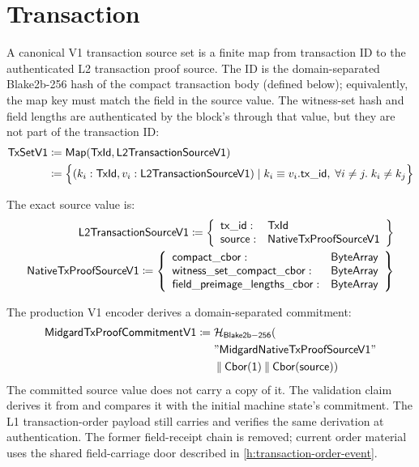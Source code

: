\documentclass[../midgard.tex]{subfiles}
\begin{document}
\section{Transaction}
\label{h:transaction}

A canonical V1 transaction source set is a finite map from transaction ID to the
authenticated L2 transaction proof source.  The ID is the domain-separated Blake2b-256 hash of
the compact transaction body (defined below); equivalently, the map key must match the
 field in the source value.  The witness-set hash and field lengths
are authenticated by the block's  through that value,
but they are not part of the transaction ID:
\begin{align*}
    \mathsf{TxSetV1} &\coloneq \mathsf{Map(TxId, L2TransactionSourceV1)} \\
      &\coloneq \Bigl\{
        (k_i: \mathsf{TxId}, v_i: \mathsf{L2TransactionSourceV1}) \mid
        k_i \equiv v_i.\mathsf{tx\_id} ,\;
        \forall i \neq j.\; k_i \neq k_j
    \Bigr\}
\end{align*}

The exact source value is:
\begin{align*}
    \mathsf{L2TransactionSourceV1} \coloneq \left\{
      \begin{array}{ll}
        \mathsf{tx\_id} : & \mathsf{TxId} \\
        \mathsf{source} : & \mathsf{NativeTxProofSourceV1}
      \end{array} \right\} \\
    \mathsf{NativeTxProofSourceV1} \coloneq \left\{
      \begin{array}{ll}
        \mathsf{compact\_cbor} : & \mathsf{ByteArray} \\
        \mathsf{witness\_set\_compact\_cbor} : & \mathsf{ByteArray} \\
        \mathsf{field\_preimage\_lengths\_cbor} : & \mathsf{ByteArray}
      \end{array} \right\}
\end{align*}

The production V1 encoder derives a domain-separated commitment:
\begin{align*}
  \mathsf{MidgardTxProofCommitmentV1} \coloneq {}& \mathcal{H}_{\mathsf{Blake2b-256}}( \\
    & \mathsf{"MidgardNativeTxProofSourceV1"} \\
    & \mathbin{\Vert} \mathsf{Cbor(1)} \mathbin{\Vert} \mathsf{Cbor(source)})
\end{align*}
The committed source value does not carry a copy of it.
The validation claim derives it from  and compares it with the initial machine state's commitment.
The L1 transaction-order payload still carries  and verifies the same derivation at authentication.
The former field-receipt chain is removed; current order material uses the shared field-carriage door described in \cref{h:transaction-order-event}.
\end{document}
